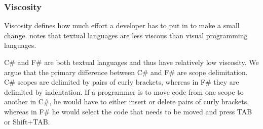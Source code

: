 \subsubsection{Viscosity}
Viscosity defines how much effort a developer has to put in to make a small change. \cite{green1996usability} notes that textual languages are less viscous than visual programming languages.

C\# and F\# are both textual languages and thus have relatively low viscosity. We argue that the primary difference between C\# and F\# are scope delimitation. C\# scopes are delimited by pairs of curly brackets, whereas in F\# they are delimited by indentation. If a programmer is to move code from one scope to another in C\#, he would have to either insert or delete pairs of curly brackets, whereas in F\# he would select the code that needs to be moved and press TAB or Shift+TAB.